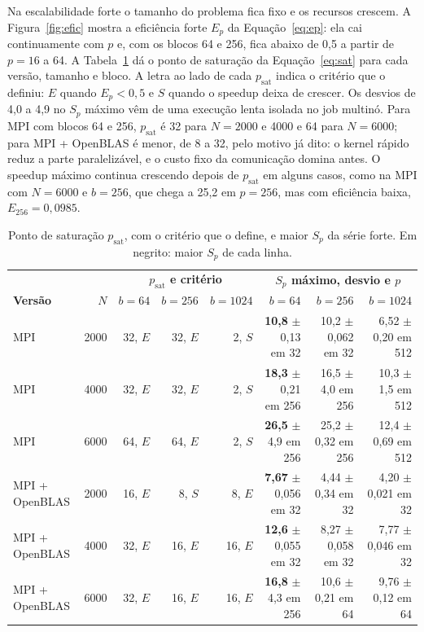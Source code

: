 \documentclass[Portugues]{ic-tese-v3}
\DeclareRobustCommand{\_}{\textunderscore\allowbreak} %
\begin{document}
Na escalabilidade forte o tamanho do problema fica fixo e os recursos crescem. A Figura~\ref{fig:efic} mostra a eficiência forte $E_p$ da Equação~\eqref{eq:ep}: ela cai continuamente com $p$ e, com os blocos 64 e 256, fica abaixo de 0,5 a partir de $p=16$ a 64. A Tabela~\ref{tab:sat} dá o ponto de saturação da Equação~\eqref{eq:sat} para cada versão, tamanho e bloco. A letra ao lado de cada $p_{\mathrm{sat}}$ indica o critério que o definiu: $E$ quando $E_p<0{,}5$ e $S$ quando o speedup deixa de crescer. Os desvios de 4,0 a 4,9 no $S_p$ máximo vêm de uma execução lenta isolada no job multinó. Para MPI com blocos 64 e 256, $p_{\mathrm{sat}}$ é 32 para $N=2000$ e 4000 e 64 para $N=6000$; para MPI + OpenBLAS é menor, de 8 a 32, pelo motivo já dito: o kernel rápido reduz a parte paralelizável, e o custo fixo da comunicação domina antes. O speedup máximo continua crescendo depois de $p_{\mathrm{sat}}$ em alguns casos, como na MPI com $N=6000$ e $b=256$, que chega a 25,2 em $p=256$, mas com eficiência baixa, $E_{256} = 0{,}0985$.

\begin{table}[H]
\centering\footnotesize
\renewcommand{\arraystretch}{1.05}\setlength{\tabcolsep}{4pt}
\begin{tabular}{|l|r|r|r|r|r|r|r|}
\hline
 & & \multicolumn{3}{c|}{\textbf{$p_{\mathrm{sat}}$ e critério}} & \multicolumn{3}{c|}{\textbf{$S_p$ máximo, desvio e $p$}} \\
\textbf{Versão} & \textbf{$N$} & \textbf{$b=64$} & \textbf{$b=256$} & \textbf{$b=1024$} & \textbf{$b=64$} & \textbf{$b=256$} & \textbf{$b=1024$} \\
\hline\hline
MPI & 2000 & 32, $E$ & 32, $E$ & 2, $S$ & \textbf{10,8} $\pm$ 0,13 em 32 & 10,2 $\pm$ 0,062 em 32 & 6,52 $\pm$ 0,20 em 512 \\ \hline
MPI & 4000 & 32, $E$ & 32, $E$ & 2, $S$ & \textbf{18,3} $\pm$ 0,21 em 256 & 16,5 $\pm$ 4,0 em 256 & 10,3 $\pm$ 1,5 em 512 \\ \hline
MPI & 6000 & 64, $E$ & 64, $E$ & 2, $S$ & \textbf{26,5} $\pm$ 4,9 em 256 & 25,2 $\pm$ 0,32 em 256 & 12,4 $\pm$ 0,69 em 512 \\ \hline\hline
MPI + OpenBLAS & 2000 & 16, $E$ & 8, $S$ & 8, $E$ & \textbf{7,67} $\pm$ 0,056 em 32 & 4,44 $\pm$ 0,34 em 32 & 4,20 $\pm$ 0,021 em 32 \\ \hline
MPI + OpenBLAS & 4000 & 32, $E$ & 16, $E$ & 16, $E$ & \textbf{12,6} $\pm$ 0,055 em 32 & 8,27 $\pm$ 0,058 em 32 & 7,77 $\pm$ 0,046 em 32 \\ \hline
MPI + OpenBLAS & 6000 & 32, $E$ & 16, $E$ & 16, $E$ & \textbf{16,8} $\pm$ 4,3 em 256 & 10,6 $\pm$ 0,21 em 64 & 9,76 $\pm$ 0,12 em 64 \\ \hline
\end{tabular}
\caption{Ponto de saturação $p_{\mathrm{sat}}$, com o critério que o define, e maior $S_p$ da série forte. Em negrito: maior $S_p$ de cada linha.}
\label{tab:sat}
\end{table}
\end{document}
